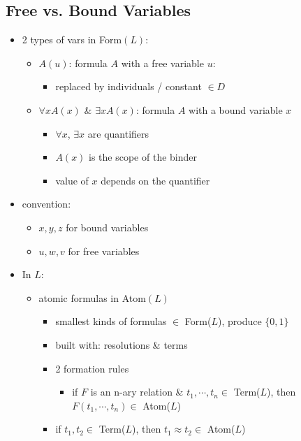 \documentclass[11pt]{article}
\begin{document}
\subsection{Free vs. Bound Variables}
\begin{itemize}
    \item 2 types of vars in Form$(L)$:
    \begin{itemize}
        \item $A(u)$: formula $A$ with a free variable $u$:
        \begin{itemize}
            \item replaced by individuals / constant $\in D$
        \end{itemize}
        \item $\forall x A(x)$ \& $\exists x A(x)$: formula $A$ with a bound variable $x$
        \begin{itemize}
            \item $\forall x$, $\exists x$ are quantifiers
            \item $A(x)$ is the scope of the binder 
            \item value of $x$ depends on the quantifier
        \end{itemize}
    \end{itemize}
    \item convention:
    \begin{itemize}
        \item $x,y,z$ for bound variables 
        \item $u,w,v$ for free variables 
    \end{itemize}
    \item In $L$:
    \begin{itemize}
        \item atomic formulas in Atom$(L)$
        \begin{itemize}
            \item smallest kinds of formulas $\in$ Form($L$), produce $\{0,1\}$
            \item built with: resolutions \& terms 
            \item 2 formation rules 
            \begin{itemize}
                \item if $F$ is an n-ary relation \& $t_1, \cdots, t_n\in$ Term($L$), then $F(t_1,\cdots,t_n)\in$ Atom($L$)
            \end{itemize}
            \item if $t_1,t_2\in$ Term($L$), then $t_1\approx t_2\in$ Atom($L$)

\end{itemize}
\end{itemize}
\end{itemize}
\end{document}
